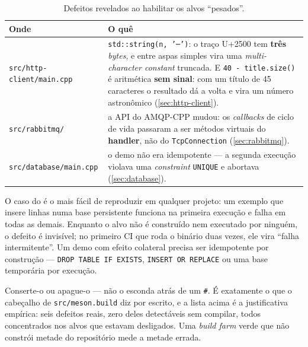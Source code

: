\begin{table}[htbp]
\centering
\caption{Defeitos revelados ao habilitar os alvos ``pesados''.}
\label{tab:bugs-externos}
\footnotesize
\begin{tabular}{@{}p{}p{}@{}}
\toprule
\textbf{Onde} & \textbf{O quê} \\
\midrule
\texttt{src/http-client/main.cpp} &
\texttt{std::string(n, '─')}: o traço U+2500 tem \textbf{três} \emph{bytes}, e
entre aspas simples vira uma \emph{multi-character constant} truncada. E
\texttt{40 - title.size()} é aritmética \textbf{sem sinal}: com um título de 45
caracteres o resultado dá a volta e vira um número astronômico
(\cref{sec:http-client}). \\
\addlinespace
\texttt{src/rabbitmq/} &
a API do AMQP-CPP mudou: os \emph{callbacks} de ciclo de vida passaram a ser
métodos virtuais do \textbf{handler}, não do \texttt{TcpConnection}
(\cref{sec:rabbitmq}). \\
\addlinespace
\texttt{src/database/main.cpp} &
o demo não era idempotente --- a segunda execução violava uma \emph{constraint}
\texttt{UNIQUE} e abortava (\cref{sec:database}). \\
\bottomrule
\end{tabular}
\end{table}

\begin{armadilha}
O caso do  é o mais fácil de reproduzir em qualquer projeto:
um exemplo que insere linhas numa base persistente funciona na primeira
execução e falha em todas as demais. Enquanto o alvo não é construído nem
executado por ninguém, o defeito é invisível; no primeiro CI que roda o binário
duas vezes, ele vira ``falha intermitente''. Um demo com efeito colateral
precisa ser idempotente por construção --- \texttt{DROP TABLE IF EXISTS},
\texttt{INSERT OR REPLACE} ou uma base temporária por execução.
\end{armadilha}

\begin{regra}
Conserte-o ou apague-o --- não o esconda atrás de um \texttt{\#}. É exatamente
o que o cabeçalho de \texttt{src/meson.build} diz por escrito, e a lista acima
é a justificativa empírica: seis defeitos reais, zero deles detectáveis sem
compilar, todos concentrados nos alvos que estavam desligados. Uma
\emph{build farm} verde que não constrói metade do repositório mede a metade
errada.
\end{regra}

